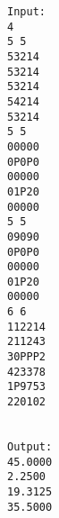 \begin{verbatim}
Input:
4
5 5
53214
53214
53214
54214
53214
5 5
00000
0P0P0
00000
01P20
00000
5 5
09090
0P0P0
00000
01P20
00000
6 6
112214
211243
30PPP2
423378
1P9753
220102


Output:
45.0000
2.2500
19.3125
35.5000

\end{verbatim}